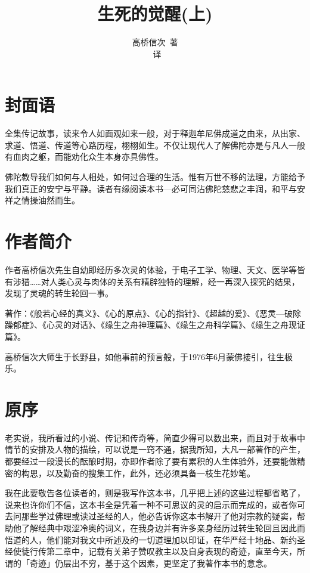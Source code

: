 \documentclass[twoside,openany]{book}
\title{生死的觉醒(上)}
\author{高桥信次\ 著\\ \xpinyin*{慰宣}\ 译}
\date{}
\begin{document}
\maketitle
\tableofcontents

\noindent
\chapter*{封面语}
全集传记故事，读来令人如面观如来一般，对于释迦牟尼佛成道之由来，从出家、求道、悟道、传道等心路历程，栩栩如生。不仅让现代人了解佛陀亦是与凡人一般有血肉之躯，而能劝化众生本身亦具佛性。

佛陀教导我们如何与人相处，如何过合理的生活。惟有万世不移的法理，方能给予我们真正的安宁与平静。读者有缘阅读本书---必可同沾佛陀慈悲之丰润，和平与安祥之情操油然而生。

\chapter*{作者简介}
作者高桥信次先生自幼即经历多次灵的体验，于电子工学、物理、天文、医学等皆有涉猎……对人类心灵与肉体的关系有精辟独特的理解，经一再深入探究的结果，发现了灵魂的转生轮回一事。

著作：《般若心经的真义》、《心的原点》、《心的指针》、《超越的爱》、《恶灵---破除躁郁症》、《心灵的对话》、《缘生之舟神理篇》、《缘生之舟科学篇》、《缘生之舟现证篇》。

高桥信次大师生于长野县，如他事前的预言般，于1976年6月蒙佛接引，往生极乐。

\chapter*{原序}
老实说，我所看过的小说、传记和传奇等，简直少得可以数出来，而且对于故事中情节的安排及人物的描绘，可以说是一窍不通，据我所知，大凡一部著作的产生，都要经过一段漫长的酝酿时期，亦即作者除了要有累积的人生体验外，还要能做精密的构思，以及勤奋的搜集工作，此外，还必须具备一枝生花妙笔。

我在此要敬告各位读者的，则是我写作这本书，几乎把上述的这些过程都省略了，说来也许你们不信，这本书全是凭着一种不可思议的灵的启示而完成的，或者你可去问那些学过佛理或读过圣经的人，他必告诉你这本书解开了他对宗教的疑窦，帮助他了解经典中艰涩冷奥的词义，在我身边并有许多亲身经历过转生轮回且因此而悟道的人，他们能对我文中所述及的一切道理加以印证，在华严经十地品、新约圣经使徒行传第二章中，记载有关弟子赞叹教主以及自身表现的奇迹，直至今天，所谓的「奇迹」仍层出不穷，基于这个因素，更坚定了我著作本书的意念。
\end{document}

